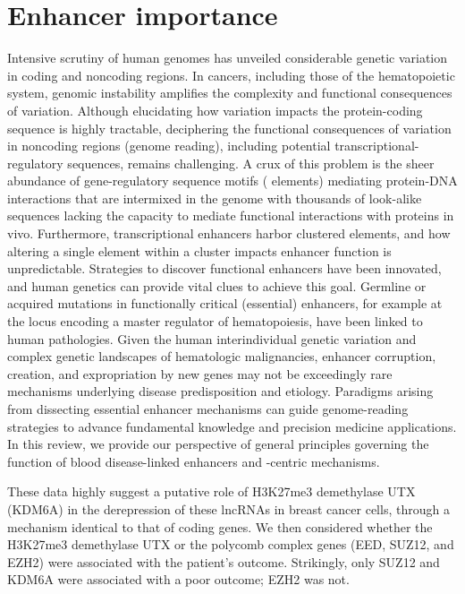




\chapter{Enhancer importance}
\minitoc

Intensive scrutiny of human genomes has unveiled considerable genetic variation in coding and noncoding regions. In cancers, including those of the hematopoietic system, genomic instability amplifies the complexity and functional consequences of variation. Although elucidating how variation impacts the protein-coding sequence is highly tractable, deciphering the functional consequences of variation in noncoding regions (genome reading), including potential transcriptional-regulatory sequences, remains challenging. A crux of this problem is the sheer abundance of gene-regulatory sequence motifs (  elements) mediating protein-DNA interactions that are intermixed in the genome with thousands of look-alike sequences lacking the capacity to mediate functional interactions with proteins in vivo. Furthermore, transcriptional enhancers harbor clustered   elements, and how altering a single   element within a cluster impacts enhancer function is unpredictable. Strategies to discover functional enhancers have been innovated, and human genetics can provide vital clues to achieve this goal. Germline or acquired mutations in functionally critical (essential) enhancers, for example at the   locus encoding a master regulator of hematopoiesis, have been linked to human pathologies. Given the human interindividual genetic variation and complex genetic landscapes of hematologic malignancies, enhancer corruption, creation, and expropriation by new genes may not be exceedingly rare mechanisms underlying disease predisposition and etiology. Paradigms arising from dissecting essential enhancer mechanisms can guide genome-reading strategies to advance fundamental knowledge and precision medicine applications. In this review, we provide our perspective of general principles governing the function of blood disease-linked enhancers and  -centric mechanisms.
\cite{Bresnick2019}


These data highly suggest a putative role of H3K27me3 demethylase UTX (KDM6A) in the derepression of these lncRNAs in breast cancer cells, through a mechanism identical to that of coding genes. We then considered whether the H3K27me3 demethylase UTX or the polycomb complex genes (EED, SUZ12, and EZH2) were associated with the patient’s outcome. Strikingly, only SUZ12 and KDM6A were associated with a poor outcome; EZH2 was not.\cite{Su2014a} %



